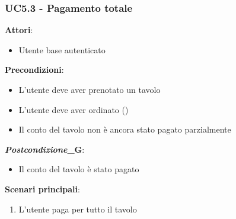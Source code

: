 \subsubsection{UC5.3 - Pagamento totale}\label{usecase:5.3}
\textbf{Attori}:
\begin{itemize}
    \item Utente base autenticato
\end{itemize}
\textbf{Precondizioni}:
\begin{itemize}
    \item L'utente deve aver prenotato un tavolo
    \item L'utente deve aver ordinato ()
    \item Il conto del tavolo non è ancora stato pagato parzialmente
\end{itemize}
\textbf{\textit{Postcondizione}_G}:
\begin{itemize}
    \item Il conto del tavolo è stato pagato
\end{itemize}
\textbf{Scenari principali}:
\begin{enumerate}
    \item L'utente paga per tutto il tavolo
\end{enumerate}